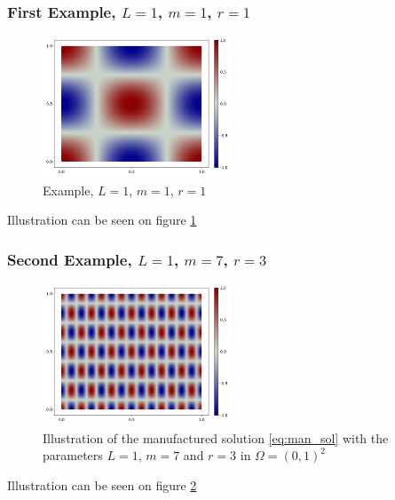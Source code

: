 \subsubsection{First Example, $L=1$, $m=1$, $r=1$}%
\label{sub:first_example}

\begin{figure}[tbh!]
    \centering
    \includegraphics[width=0.5\textwidth]{figures/model/l_1.0_m_1_r_1n_100_sol.png}
    \caption{Example, $L=1$, $m=1$, $r=1$}
    \label{fig:sol_l1_m1_r1}
\end{figure}


Illustration can be seen on figure \ref{fig:sol_l1_m1_r1}

\subsubsection{Second Example, $L=1$, $m=7$, $r=3$}%
\label{sub:second_example}

\begin{figure}[tbh!]
    \centering
    \includegraphics[width=0.5\textwidth]{figures/model/l_1.0_m_7_r_3n_100_sol.png}
    \caption{Illustration of the manufactured solution \eqref{eq:man_sol}   with the parameters $L=1$, $m=7$ and $r=3$ in $\Omega = (0,1)^2$}
    \label{fig:sol_l1_m7_r3}
\end{figure}

Illustration can be seen on figure \ref{fig:sol_l1_m7_r3}

